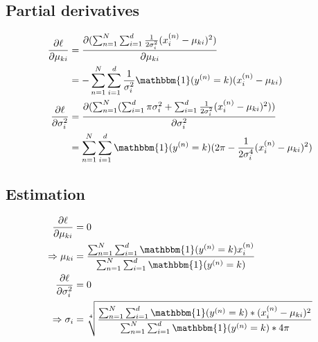 \documentclass[a4paper]{article}
\begin{document}
\subsection{Partial derivatives}

\begin{align*}
    \frac{\partial \ell}{\partial \mu_{ki}}&=\frac{\partial(\sum^N_{n=1}\sum^d_{i=1}\frac{1}{2\sigma^2_i}(x^{(n)}_i-\mu_{ki})^2)}{\partial \mu_{ki}}\\
    &=-\sum^N_{n=1}\sum^d_{i=1}\frac{1}{\sigma^2_i}\mathbbm{1}(y^{(n)}=k)(x^{(n)}_i-\mu_{ki})\\
    \frac{\partial \ell}{\partial \sigma_i^2}&=\frac{\partial(\sum^N_{n=1}(\sum^d_{i=1}\pi\sigma^2_i+\sum^d_{i=1}\frac{1}{2\sigma^2_i}(x^{(n)}_i-\mu_{ki})^2))}{\partial \sigma_i^2}\\
    &=\sum^N_{n=1}\sum^d_{i=1}\mathbbm{1}(y^{(n)}=k)(2\pi-\frac{1}{2\sigma^4_i}(x^{(n)}_i-\mu_{ki})^2)
\end{align*}

\subsection{Estimation}

\begin{align*}
    \frac{\partial \ell}{\partial \mu_{ki}}&=0\\
    \Rightarrow\mu_{ki}&=\frac{\sum^N_{n=1}\sum^d_{i=1}\mathbbm{1}(y^{(n)}=k)x^{(n)}_i}{\sum^N_{n=1}\sum^d_{i=1}\mathbbm{1}(y^{(n)}=k)}\\
    \frac{\partial \ell}{\partial \sigma_i^2}&=0\\
    \Rightarrow\sigma_i&=\sqrt[4]{\frac{\sum^N_{n=1}\sum^d_{i=1}\mathbbm{1}(y^{(n)}=k)*(x^{(n)}_i-\mu_{ki})^2}{\sum^N_{n=1}\sum^d_{i=1}\mathbbm{1}(y^{(n)}=k)*4\pi}}
\end{align*}






\end{document}
